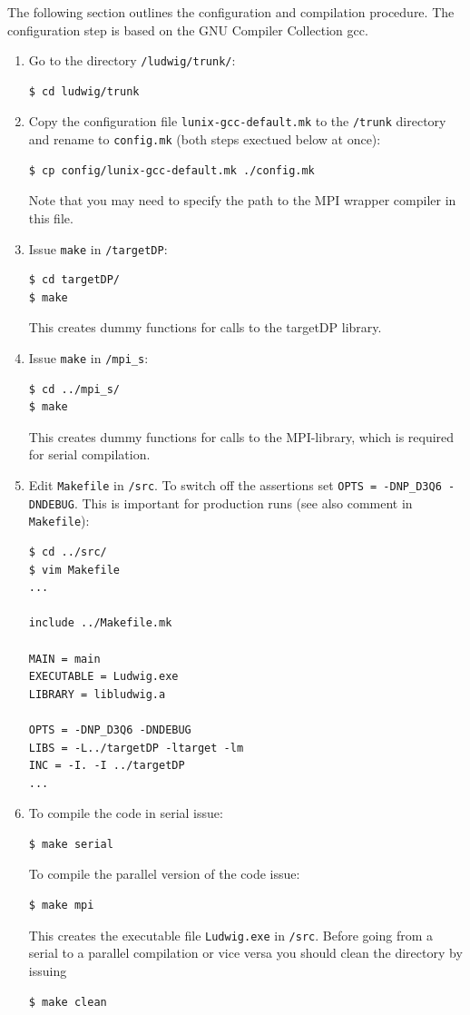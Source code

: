 \documentclass[11pt,twoside,a4paper]{article}
\begin{document}
The following section outlines the configuration and compilation 
procedure. The configuration step is based on the GNU Compiler Collection gcc.

\begin{enumerate}
\item Go to the directory \texttt{/ludwig/trunk/}: \\
\begin{lstlisting}
$ cd ludwig/trunk
\end{lstlisting}
\item Copy the configuration file \texttt{lunix-gcc-default.mk} to the \texttt{/trunk} directory 
and rename to \texttt{config.mk} (both steps exectued below at once): \\
\begin{lstlisting}
$ cp config/lunix-gcc-default.mk ./config.mk
\end{lstlisting}
Note that you may need to specify the path to the MPI wrapper compiler in this file.
\item Issue \texttt{make} in \texttt{/targetDP}: \\
\begin{lstlisting}
$ cd targetDP/
$ make 
\end{lstlisting}
This creates dummy functions for calls to the targetDP library.
\item Issue \texttt{make} in \texttt{/mpi\_s}: \\
\begin{lstlisting}
$ cd ../mpi_s/
$ make 
\end{lstlisting}
This creates dummy functions for calls to the MPI-library,
which is required for serial compilation.
\item Edit \texttt{Makefile} in \texttt{/src}. To switch off 
the assertions set \texttt{OPTS = -DNP\_D3Q6 -DNDEBUG}. This is
important for production runs (see also comment in \texttt{Makefile}): \\
\begin{lstlisting}
$ cd ../src/
$ vim Makefile
...

include ../Makefile.mk

MAIN = main
EXECUTABLE = Ludwig.exe
LIBRARY = libludwig.a

OPTS = -DNP_D3Q6 -DNDEBUG
LIBS = -L../targetDP -ltarget -lm
INC = -I. -I ../targetDP
...
\end{lstlisting}
\item To compile the code in serial issue: \\
\begin{lstlisting}
$ make serial
\end{lstlisting} 
To compile the parallel version of the code issue: \\
\begin{lstlisting}
$ make mpi
\end{lstlisting} 
This creates the executable file \texttt{Ludwig.exe} in \texttt{/src}. 
Before going from a serial to a parallel compilation or vice versa
you should clean the directory by issuing
\begin{lstlisting}
$ make clean
\end{lstlisting}

\end{enumerate}
\end{document}
